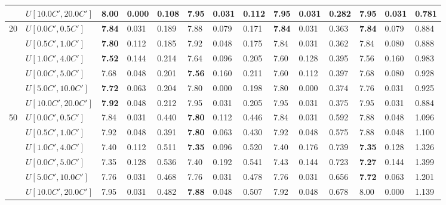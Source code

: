 \begin{table}[h]
{\begin{tabular}{|l|l||l|l|l||l|l|l||l|l|l||l|l|l|}
       & $U[10.0C',20.0C']$ & 8.00 & 0.000 & 0.108 & \textbf{7.95} & 0.031 & 0.112 & \textbf{7.95} & 0.031 & 0.282 & \textbf{7.95} & 0.031 & 0.781 \\
      \hline\hline
      \multirow{6}{*}{20} & $U[0.0C',0.5C']$ & \textbf{7.84} & 0.031 & 0.189 & 7.88 & 0.079 & 0.171 & \textbf{7.84} & 0.031 & 0.363 & \textbf{7.84} & 0.079 & 0.884 \\
       & $U[0.5C',1.0C']$ & \textbf{7.80} & 0.112 & 0.185 & 7.92 & 0.048 & 0.175 & 7.84 & 0.031 & 0.362 & 7.84 & 0.080 & 0.888 \\
       & $U[1.0C',4.0C']$ & \textbf{7.52} & 0.144 & 0.214 & 7.64 & 0.096 & 0.205 & 7.60 & 0.128 & 0.395 & 7.56 & 0.160 & 0.983 \\
       & $U[0.0C',5.0C']$ & 7.68 & 0.048 & 0.201 & \textbf{7.56} & 0.160 & 0.211 & 7.60 & 0.112 & 0.397 & 7.68 & 0.080 & 0.928 \\
       & $U[5.0C',10.0C']$ & \textbf{7.72} & 0.063 & 0.204 & 7.80 & 0.000 & 0.198 & 7.80 & 0.000 & 0.374 & 7.76 & 0.031 & 0.925 \\
       & $U[10.0C',20.0C']$ & \textbf{7.92} & 0.048 & 0.212 & 7.95 & 0.031 & 0.205 & 7.95 & 0.031 & 0.375 & 7.95 & 0.031 & 0.884 \\
      \hline\hline
      \multirow{6}{*}{50} & $U[0.0C',0.5C']$ & 7.84 & 0.031 & 0.440 & \textbf{7.80} & 0.112 & 0.446 & 7.84 & 0.031 & 0.592 & 7.88 & 0.048 & 1.096 \\
       & $U[0.5C',1.0C']$ & 7.92 & 0.048 & 0.391 & \textbf{7.80} & 0.063 & 0.430 & 7.92 & 0.048 & 0.575 & 7.88 & 0.048 & 1.100 \\
       & $U[1.0C',4.0C']$ & 7.40 & 0.112 & 0.511 & \textbf{7.35} & 0.096 & 0.520 & 7.40 & 0.176 & 0.739 & \textbf{7.35} & 0.128 & 1.326 \\
       & $U[0.0C',5.0C']$ & 7.35 & 0.128 & 0.536 & 7.40 & 0.192 & 0.541 & 7.43 & 0.144 & 0.723 & \textbf{7.27} & 0.144 & 1.399 \\
       & $U[5.0C',10.0C']$ & 7.76 & 0.031 & 0.468 & 7.76 & 0.031 & 0.478 & 7.76 & 0.031 & 0.656 & \textbf{7.72} & 0.063 & 1.201 \\
       & $U[10.0C',20.0C']$ & 7.95 & 0.031 & 0.482 & \textbf{7.88} & 0.048 & 0.507 & 7.92 & 0.048 & 0.678 & 8.00 & 0.000 & 1.139 \\
      \hline
      \end{tabular}
      }
      \label{tab:pcpn100}\end{table}


